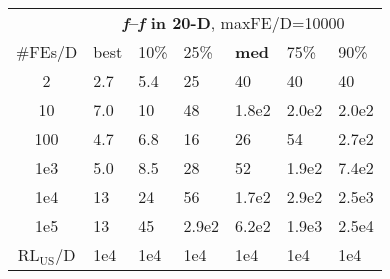 \begin{tabular}{c|llllll}
 & \multicolumn{6}{|c}{\textbf{\textit{f}\raisebox{-0.35ex}{1}--\textit{f}\raisebox{-0.35ex}{24} in 20-D}, maxFE/D=10000}\\
\#FEs/D & best & 10\% & 25\% & \textbf{med} & 75\% & 90\%\\
2 & \hspace*{1ex}2.7 & \hspace*{1ex}5.4 & 25 & 40 & 40 & 40\\
10 & \hspace*{1ex}7.0 & 10 & 48 & 1.8e2 & 2.0e2 & 2.0e2\\
100 & \hspace*{1ex}4.7 & \hspace*{1ex}6.8 & 16 & 26 & 54 & 2.7e2\\
1e3 & \hspace*{1ex}5.0 & \hspace*{1ex}8.5 & 28 & 52 & 1.9e2 & 7.4e2\\
1e4 & 13 & 24 & 56 & 1.7e2 & 2.9e2 & 2.5e3\\
1e5 & 13 & 45 & 2.9e2 & 6.2e2 & 1.9e3 & 2.5e4\\
$\text{RL}_{\text{US}}$/D & 1e4 & 1e4 & 1e4 & 1e4 & 1e4 & 1e4
\end{tabular}
